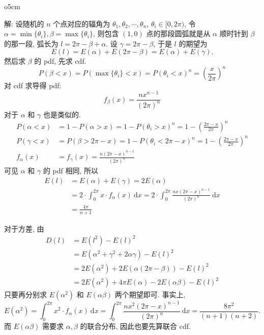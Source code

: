 \begin{wrapfigure}{o}{5cm}
\end{wrapfigure}
解: 设随机的 $n$ 个点对应的辐角为 $\theta_1, \theta_2, \cdots, \theta_n$, $\theta_i\in[0,2\pi)$, 令 $\alpha = \min\{\theta_i\}, \beta = \max\{\theta_i\}$, 则包含 $(1,0)$ 点的那段圆弧就是从 $\alpha$ 顺时针到 $\beta$ 的那一段, 弧长为 $l = 2\pi - \beta + \alpha$. 设 $\gamma = 2\pi - \beta$, 
于是 $l$ 的期望为 
\[E(l) = E(\alpha) + E(2\pi - \beta) = E(\alpha) + E(\gamma).\]
然后求 $\beta$ 的 pdf, 先求 cdf. 
\[
P(\beta < x) = P(\max\{\theta_i\} < x) = P(\theta_i < x)^n = \left(\frac{x}{2\pi}\right)^n 
\]
对 cdf 求导得 pdf:
\[ f_\beta(x) = \frac{nx^{n-1}}{(2\pi)^n} \]
对于 $\alpha$ 和 $\gamma$ 也是类似的.
\begin{align*}
P(\alpha < x) &= 1 - P(\alpha > x) = 1 - P(\theta_i > x)^n = 1 - \left(\frac{2\pi - x}{2\pi}\right)^n \\
P(\gamma < x) &= P(\beta > 2\pi - x) = 1 - P(\theta_i < 2\pi - x)^n = 1 - \left(\frac{2\pi - x}{2\pi}\right)^n \\
f_\alpha(x) &= f_\gamma(x) = \frac{n(2\pi-x)^{n-1}}{(2\pi)^n}
\end{align*}
可见 $\alpha$ 和 $\gamma$ 的 pdf 相同, 所以
\begin{align*}
E(l) &= E(\alpha) + E(\gamma) = 2E(\alpha) \\
&=2\cdot \int_0^{2\pi} x\cdot f_\alpha(x)\ \mathrm{d}x = 2\cdot \int_0^{2\pi} \frac{nx(2\pi - x)^{n-1}}{(2\pi)^n}\ \mathrm{d}x \\
&= \frac{4\pi}{n+1}
\end{align*}

对于方差, 由 
\begin{align*}
D(l) &= E(l^2) - E(l)^2 \\
&= E(\alpha^2 + \gamma^2 + 2\alpha\gamma) - E(l)^2 \\
&= 2E(\alpha^2) + 2E(\alpha(2\pi-\beta)) - E(l)^2 \\
&= 2E(\alpha^2) + 4\pi E(\alpha) - 2E(\alpha\beta) - E(l)^2
\end{align*}
只要再分别求 $E(\alpha^2)$ 和 $E(\alpha\beta)$ 两个期望即可. 事实上,
\[E(\alpha^2) = \int_0^{2\pi} x^2\cdot f_\alpha(x)\ \mathrm{d}x = \int_0^{2\pi} \frac{nx^2(2\pi-x)^{n-1}}{(2\pi)^{n}}\ \mathrm{d}x = \frac{8\pi^2}{(n+1)(n+2)} .\]
而 $E(\alpha\beta)$ 需要求 $\alpha,\beta$ 的联合分布, 因此也要先算联合 cdf. 

